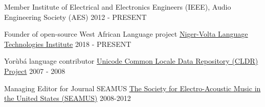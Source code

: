 

\begin{cventries}
	
  \cventry
    {Member} %
    {Institute of Electrical and Electronics Engineers (IEEE), Audio Engineering Society (AES)} %
    {} %
    {2012 - PRESENT} %
    {}

  \cventry
    {Founder of open-source West African Language project} %
    {\href{https://github.com/Niger-Volta-LTI}{Niger-Volta Language Technologies Institute}} %
    {} %
    {2018 - PRESENT} %
    {}

  \cventry
    {Yor{\`u}b{\'a} language contributor} %
    {\href{http://cldr.unicode.org}{Unicode Common Locale Data Repository (CLDR) Project}} %
    {} %
    {2007 - 2008} %
    {}

  \cventry
    {Managing Editor for Journal SEAMUS} %
    {\href{https://www.seamusonline.org}{The Society for Electro-Acoustic Music in the United States (SEAMUS)}} %
    {} %
    {2008-2012} %
    {}
	
\end{cventries}
